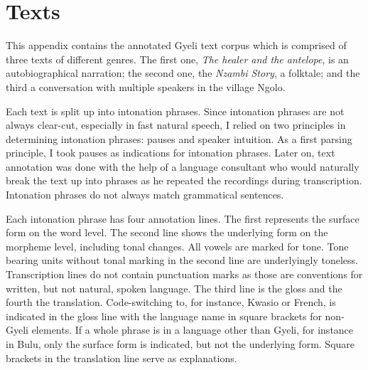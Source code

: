 

%
%

\chapter{Texts}
\label{sec:AppendixII}
\label{sec:AppII}


This appendix contains the annotated Gyeli text corpus which is comprised of three texts of different genres. The first one, {\itshape The healer and the antelope}, is an autobiographical narration; the second one, the {\itshape Nzambi Story}, a folktale; and the third a conversation with multiple speakers in the village Ngolo. 

Each text is split up into intonation phrases. Since intonation phrases are not always clear-cut, especially in fast natural speech, I relied on two principles in determining intonation phrases: pauses and speaker intuition. As a first parsing principle, I took pauses as indications for intonation phrases. Later on, text annotation was done with the help of a language consultant who would naturally break the text up into phrases as he repeated the recordings during transcription.
Intonation phrases do not always match grammatical sentences. 

Each intonation phrase has four annotation lines. The first represents the surface form on the word level. The second line shows the underlying form on the morpheme level, including tonal changes. All vowels are marked for tone. Tone bearing units without tonal marking in the second line are underlyingly toneless. Transcription lines do not contain punctuation marks as those are conventions for written, but not natural, spoken language. The third line is the gloss and the fourth the translation. Code-switching to, for instance, Kwasio or French, is indicated in the gloss line with the language name in square brackets for non-Gyeli elements. If a whole phrase is in a language other than Gyeli, for instance in Bulu, only the surface form is indicated, but not the underlying form. Square brackets in the translation line serve as explanations.





